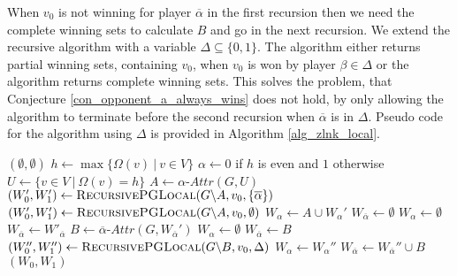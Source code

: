 When $v_0$ is not winning for player $\overline{\alpha}$ in the first recursion then we need the complete winning sets to calculate $B$ and go in the next recursion. We extend the recursive algorithm with a variable $\Delta \subseteq \{0,1\}$. The algorithm either returns partial winning sets, containing $v_0$, when $v_0$ is won by player $\beta\in \Delta$ or the algorithm returns complete winning sets. This solves the problem, that Conjecture \ref{con_opponent_a_always_wins} does not hold, by only allowing the algorithm to terminate before the second recursion when $\overline{\alpha}$ is in $\Delta$. Pseudo code for the algorithm using $\Delta$ is provided in Algorithm \ref{alg_zlnk_local}.
\begin{algorithm}
	\caption{$\textsc{RecursivePGLocal}(\textit{parity game } G = (V,V_0,V_1, E, \Omega),v_0,\Delta)$}
	\label{alg_zlnk_local}
	\begin{algorithmic}[1]
			\State \Return $(\emptyset, \emptyset)$
		\EndIf
		\State $h \gets\max\{ \Omega(v)\ |\ v \in V\}$
		\State $\alpha \gets 0$ if $h$ is even and $1$ otherwise
		\State $U \gets \{v \in V\ |\ \Omega(v) = h\}$
		\State $A \gets \alpha\textit{-Attr}(G, U)$
		\If{$\overline{\alpha} \in \Delta$}\label{line:recursivePGLocal:firstif}
		\State $(W_0', W_1') \gets \textsc{RecursivePGLocal}(G \backslash A,v_0,\{\overline{\alpha}\})$
		\Else
		\State $(W_0', W_1') \gets \textsc{RecursivePGLocal}(G \backslash A,v_0,\emptyset)$
		\EndIf
		\label{line:recursivePGLocal:emptywinif}
		\State $W_\alpha \gets A \cup W_\alpha'$
		\State $W_{\overline{\alpha}} \gets \emptyset$
		\Else
		\label{line:recursivePGLocal:v0inWopponentalpha}
		\State $W_\alpha \gets \emptyset$
		\State $W_{\overline{\alpha}} \gets W'_{\overline{\alpha}}$
		\Else
		\State $B \gets \overline{\alpha}\textit{-Attr}(G,W_{\overline{\alpha}}')$\label{line:recursivePGLocal:calcB}
		\label{line:recursivePGLocal:v0inB}
		\State $W_\alpha \gets \emptyset$
		\State $W_{\overline{\alpha}} \gets B$
		\Else
		\State $(W_0'', W_1'') \gets \textsc{RecursivePGLocal}(G \backslash B,v_0,\Delta)$\label{line:recursivePGLocal:secondrecursion}
		\State $W_\alpha \gets W_\alpha''$
		\State $W_{\overline{\alpha}} \gets W_{\overline{\alpha}}'' \cup B$
		\EndIf
		\EndIf
		\EndIf
		\State \Return $(W_0, W_1)$
	\end{algorithmic}
\end{algorithm}

